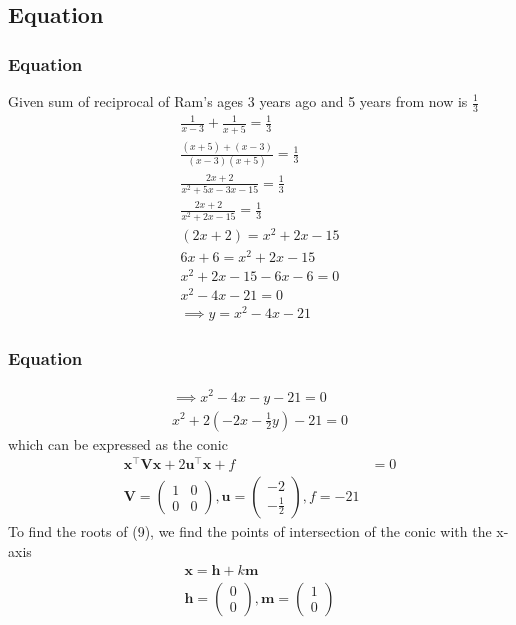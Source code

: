 \documentclass{beamer}
\providecommand{\brak}[1]{\ensuremath{\left(#1\right)}}
\theoremstyle{remark}
\newcommand{\myvec}[1]{\ensuremath{\begin{pmatrix}#1\end{pmatrix}}}
\let\vec\mathbf
\numberwithin{equation}{section}
\begin{document}
\subsection{Equation}
\begin{frame}
\frametitle{Equation}
Given sum of reciprocal of Ram's ages 3 years ago and 5 years from
now is $\frac{1}{3}$
\begin{align}
\frac{1}{x-3}+\frac{1}{x+5}=\frac{1}{3} \\
\frac{\brak{x+5}+\brak{x-3}}{\brak{x-3}\brak{x+5}}=\frac{1}{3} \\
\frac{2x+2}{x^2+5x-3x-15}=\frac{1}{3}\\
\frac{2x+2}{x^2+2x-15}=\frac{1}{3}\\
\brak{2x+2}=x^2+2x-15\\
6x+6=x^2+2x-15 \\
x^2+2x-15-6x-6=0 \\
x^2-4x-21=0 \\
\implies y=x^2-4x-21
  \end{align}
\end{frame}
\begin{frame}
\frametitle{Equation}
\begin{align}
\implies x^2-4x-y-21=0\\
x^2+2(-2x-\frac{1}{2}y)-21=0
\end{align}
 which can be expressed as the conic
  \begin{align}
       \vec{x}^\top\vec{V}\vec{x} + 2\vec{u}^\top\vec{x} + f &= 0 \\
       \vec{V}=\myvec{1 & 0 \\ 0&0},\vec{u}=\myvec{-2\\-\frac{1}{2}},f=-21
  \end{align}
   To find the roots of (9), we find the points of intersection of the conic with
the x-axis
\begin{align}
\vec{x}=\vec{h}+k\vec{m}\\
\vec{h}=\myvec{0\\0},\vec{m}=\myvec{1\\0}
\end{align}
 \end{frame}
\end{document}
